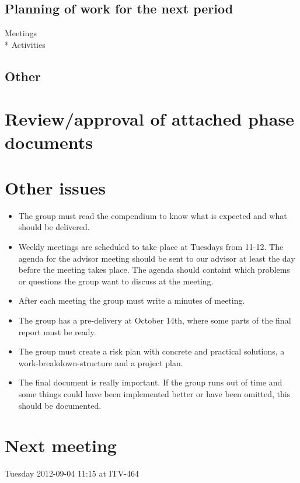 \documentclass[a4paper,12pt]{article}
\begin{document}
\subsection{Planning of work for the next period}
Meetings\\*
Activities
\subsection{Other}
\section{Review/approval of attached phase documents}
\section{Other issues}
\begin{itemize}
\item
The group must read the compendium to know what is expected and what should be delivered.
\item
Weekly meetings are scheduled to take place at Tuesdays from 11-12. The agenda for the advisor meeting should be sent to our advisor at least the day before the meeting takes place. The agenda should containt which problems or questions the group want to discuss at the meeting.
\item
After each meeting the group must write a minutes of meeting.
\item
The group has a pre-delivery at October 14th, where some parts of the final report must be ready.
\item
The group must create a risk plan with concrete and practical solutions, a work-breakdown-structure and a project plan.
\item
The final document is really important. If the group runs out of time and some things could have been implemented better or have been omitted, this should be documented. 
\end{itemize}
\section{Next meeting}
Tuesday 2012-09-04 11:15 at ITV-464
\end{document}
